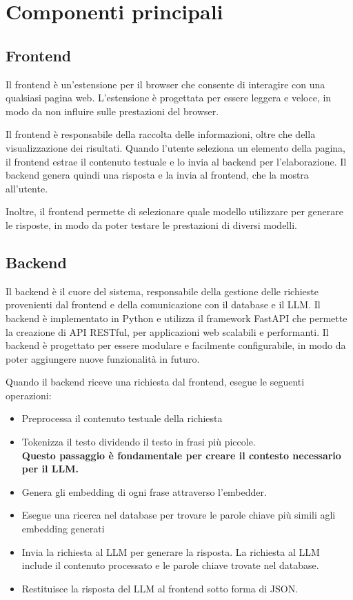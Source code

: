 \section{Componenti principali}
\label{sec:componenti}
\subsection{Frontend}
\label{sec:frontend}
Il frontend è un'estensione per il browser che consente di
interagire con una qualsiasi pagina web.
L'estensione è progettata per essere leggera e veloce, in
modo da non influire sulle prestazioni del browser.

Il frontend è responsabile della raccolta delle
informazioni, oltre che della visualizzazione dei
risultati.
Quando l'utente seleziona un elemento della pagina, il
frontend estrae il contenuto testuale e lo invia al backend
per l'elaborazione.
Il backend genera quindi una risposta e la invia al
frontend, che la mostra all'utente.

Inoltre, il frontend permette di selezionare quale modello
utilizzare per generare le risposte, in modo da poter
testare le prestazioni di diversi modelli.

\subsection{Backend}
\label{sec:backend}

Il backend è il cuore del sistema, responsabile della
gestione delle richieste provenienti dal frontend e della
comunicazione con il database e il LLM.
Il backend è implementato in Python e utilizza il framework
FastAPI che permette la creazione di API RESTful, per
applicazioni web scalabili e performanti.
Il backend è progettato per essere modulare e facilmente
configurabile, in modo da poter aggiungere nuove
funzionalità in futuro.

Quando il backend riceve una richiesta dal frontend, esegue
le seguenti operazioni:
\begin{itemize}
      \item Preprocessa il contenuto testuale della richiesta
      \item Tokenizza il testo dividendo il testo in frasi
            più piccole.\\
            \textbf{Questo passaggio è fondamentale per creare il contesto
                  necessario per il LLM.}
      \item Genera gli embedding di ogni frase attraverso
            l'embedder.
      \item Esegue una ricerca nel database per trovare le
            parole chiave più simili agli embedding generati
      \item Invia la richiesta al LLM per generare la risposta.
            La richiesta al LLM include il contenuto processato e le
            parole chiave trovate nel database.
      \item Restituisce la risposta del LLM al frontend sotto forma di
            JSON.
\end{itemize}

